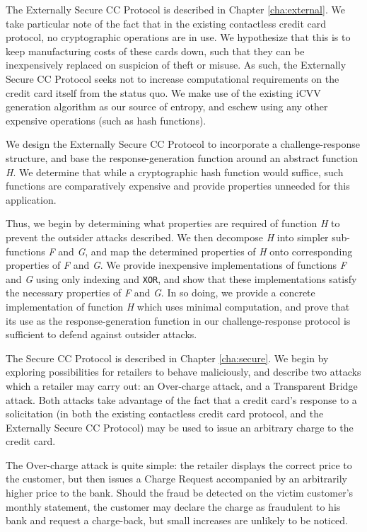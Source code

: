 
The Externally Secure CC Protocol is described in Chapter \ref{cha:external}.
We take particular note of the fact that in the existing contactless credit card protocol, no cryptographic operations are in use.
We hypothesize that this is to keep manufacturing costs of these cards down, such that they can be inexpensively replaced on suspicion of theft or misuse.
As such, the Externally Secure CC Protocol seeks not to increase computational requirements on the credit card itself from the status quo.
We make use of the existing iCVV generation algorithm as our source of entropy, and eschew using any other expensive operations (such as hash functions).

We design the Externally Secure CC Protocol to incorporate a challenge-response structure,
    and base the response-generation function around an abstract function \emph{H}.
We determine that while a cryptographic hash function would suffice, such functions are comparatively expensive and provide properties unneeded for this application.

Thus, we begin by determining what properties are required of function \emph{H} to prevent the outsider attacks described.
We then decompose \emph{H} into simpler sub-functions \emph{F} and \emph{G}, and map the determined properties of \emph{H} onto corresponding properties of \emph{F} and \emph{G}.
We provide inexpensive implementations of functions \emph{F} and \emph{G} using only indexing and \texttt{XOR},
    and show that these implementations satisfy the necessary properties of \emph{F} and \emph{G}.
In so doing, we provide a concrete implementation of function \emph{H} which uses minimal computation,
    and prove that its use as the response-generation function in our challenge-response protocol is sufficient to defend against outsider attacks.


The Secure CC Protocol is described in Chapter \ref{cha:secure}.
We begin by exploring possibilities for retailers to behave maliciously, and describe two attacks which a retailer may carry out:
    an Over-charge attack, and a Transparent Bridge attack.
Both attacks take advantage of the fact that a credit card's response to a solicitation
    (in both the existing contactless credit card protocol, and the Externally Secure CC Protocol)
    may be used to issue an arbitrary charge to the credit card.

The Over-charge attack is quite simple:
    the retailer displays the correct price to the customer, but then issues a Charge Request accompanied by an arbitrarily higher price to the bank.
Should the fraud be detected on the victim customer's monthly statement, the customer may declare the charge as fraudulent to his bank and request a charge-back,
    but small increases are unlikely to be noticed.

